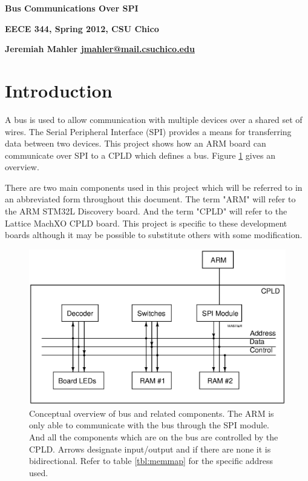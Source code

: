\documentclass{article}
\begin{document}

\centerline{\Large \textbf{Bus Communications Over SPI}}
\vspace{2em}
\centerline{\small \textbf{EECE 344, Spring 2012, CSU Chico}}
\vspace{0.5em}
\centerline{\small \textbf{Jeremiah Mahler \href{mailto:jmahler@mail.csuchico.edu}{jmahler@mail.csuchico.edu}}}
\vspace{2em}
\thispagestyle{empty}



\section{Introduction}

A bus is used to allow communication with multiple devices
over a shared set of wires.
The Serial Peripheral Interface (SPI) provides a means
for transferring data between two devices.
This project shows how an ARM board can communicate over
SPI to a CPLD which defines a bus.
Figure \ref{fig:bus} gives an overview.

There are two main components used in this project which
will be referred to in an abbreviated form throughout this document.
The term "ARM" will refer to the ARM STM32L Discovery\cite{UM1079} board.
And the term "CPLD" will refer to the Lattice MachXO\cite{EB66}
CPLD board.
This project is specific to these development boards although it
may be possible to substitute others with some modification.

\begin{figure}[hbp]
\center
\includegraphics[scale=0.7]{figures/schematics/BUS}
\caption{Conceptual overview of bus and related components.
The ARM is only able to communicate with the bus through the SPI
module.
And all the components which are on the bus are controlled by the
CPLD.
Arrows designate input/output and if there are none it is bidirectional.
Refer to table \ref{tbl:memmap} for the specific address used.
}
\label{fig:bus}
\end{figure}
\end{document}
